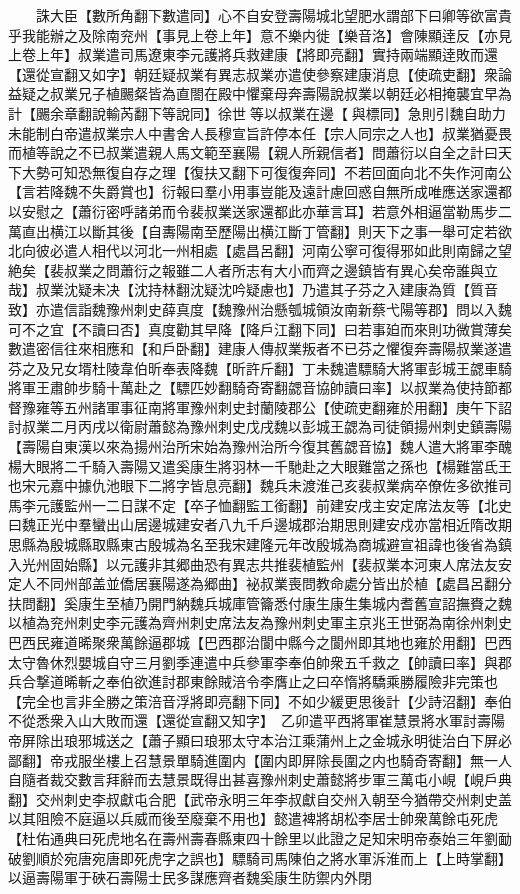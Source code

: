 　　誅大臣【數所角翻下數遣同】心不自安登壽陽城北望肥水謂部下曰卿等欲富貴乎我能辦之及除南兖州【事見上卷上年】意不樂内徙【樂音洛】會陳顯逹反【亦見上卷上年】叔業遣司馬遼東李元護將兵救建康【將即亮翻】實持兩端顯逹敗而還【還從宣翻又如字】朝廷疑叔業有異志叔業亦遣使參察建康消息【使疏吏翻】衆論益疑之叔業兄子植颺粲皆為直閤在殿中懼棄母奔壽陽說叔業以朝廷必相掩襲宜早為計【颺余章翻說輸芮翻下等說同】徐世等以叔業在邊【與標同】急則引魏自助力未能制白帝遣叔業宗人中書舍人長穆宣旨許停本任【宗人同宗之人也】叔業猶憂畏而植等說之不已叔業遣親人馬文範至襄陽【親人所親信者】問蕭衍以自全之計曰天下大勢可知恐無復自存之理【復扶又翻下可復復奔同】不若回面向北不失作河南公【言若降魏不失爵賞也】衍報曰羣小用事豈能及遠計慮回惑自無所成唯應送家還都以安慰之【蕭衍密呼諸弟而令裴叔業送家還都此亦華言耳】若意外相逼當勒馬步二萬直出横江以斷其後【自夀陽南至歷陽出横江斷丁管翻】則天下之事一舉可定若欲北向彼必遣人相代以河北一州相處【處昌呂翻】河南公寧可復得邪如此則南歸之望絶矣【裴叔業之問蕭衍之報雖二人者所志有大小而齊之邊鎮皆有異心矣帝誰與立哉】叔業沈疑未决【沈持林翻沈疑沈吟疑慮也】乃遣其子芬之入建康為質【質音致】亦遣信詣魏豫州刺史薛真度【魏豫州治懸瓠城領汝南新蔡弋陽等郡】問以入魏可不之宜【不讀曰否】真度勸其早降【降戶江翻下同】曰若事廹而來則功微賞薄矣數遣密信往來相應和【和戶卧翻】建康人傳叔業叛者不已芬之懼復奔壽陽叔業遂遣芬之及兄女壻杜陵韋伯昕奉表降魏【昕許斤翻】丁未魏遣驃騎大將軍彭城王勰車騎將軍王肅帥步騎十萬赴之【驃匹妙翻騎奇寄翻勰音協帥讀曰率】以叔業為使持節都督豫雍等五州諸軍事征南將軍豫州刺史封蘭陵郡公【使疏吏翻雍於用翻】庚午下詔討叔業二月丙戌以衛尉蕭懿為豫州刺史戊戌魏以彭城王勰為司徒領揚州刺史鎮壽陽【壽陽自東漢以來為揚州治所宋始為豫州治所今復其舊勰音協】魏人遣大將軍李醜楊大眼將二千騎入壽陽又遣奚康生將羽林一千馳赴之大眼難當之孫也【楊難當氐王也宋元嘉中據仇池眼下二將字皆息亮翻】魏兵未渡淮己亥裴叔業病卒僚佐多欲推司馬李元護監州一二日謀不定【卒子恤翻監工銜翻】前建安戌主安定席法友等【北史曰魏正光中羣蠻出山居邊城建安者八九千戶邊城郡治期思則建安戍亦當相近隋改期思縣為殷城縣取縣東古殷城為名至我宋建隆元年改殷城為商城避宣祖諱也後省為鎮入光州固始縣】以元護非其郷曲恐有異志共推裴植監州【裴叔業本河東人席法友安定人不同州部盖並僑居襄陽遂為郷曲】袐叔業喪問教命處分皆出於植【處昌呂翻分扶問翻】奚康生至植乃開門納魏兵城庫管籥悉付康生康生集城内耆舊宣詔撫賚之魏以植為兖州刺史李元護為齊州刺史席法友為豫州刺史軍主京兆王世弼為南徐州刺史　巴西民雍道晞聚衆萬餘逼郡城【巴西郡治閬中縣今之閬州即其地也雍於用翻】巴西太守魯休烈嬰城自守三月劉季連遣中兵參軍李奉伯帥衆五千救之【帥讀曰率】與郡兵合撃道晞斬之奉伯欲進討郡東餘賊涪令李膺止之曰卒惰將驕乘勝履險非完策也【完全也言非全勝之策涪音浮將即亮翻下同】不如少緩更思後計【少詩沼翻】奉伯不從悉衆入山大敗而還【還從宣翻又知字】　乙卯遣平西將軍崔慧景將水軍討壽陽帝屏除出琅邪城送之【蕭子顯曰琅邪太守本治江乘蒲州上之金城永明徙治白下屏必鄙翻】帝戎服坐樓上召慧景單騎進圍内【圍内即屏除長圍之内也騎奇寄翻】無一人自隨者裁交數言拜辭而去慧景既得出甚喜豫州刺史蕭懿將步軍三萬屯小峴【峴戶典翻】交州刺史李叔獻屯合肥【武帝永明三年李叔獻自交州入朝至今猶帶交州刺史盖以其阻險不庭逼以兵威而後至廢棄不用也】懿遣裨將胡松李居士帥衆萬餘屯死虎【杜佑通典曰死虎地名在壽州壽春縣東四十餘里以此證之足知宋明帝泰始三年劉勔破劉順於宛唐宛唐即死虎字之誤也】驃騎司馬陳伯之將水軍泝淮而上【上時掌翻】以逼壽陽軍于硤石壽陽士民多謀應齊者魏奚康生防禦内外閉